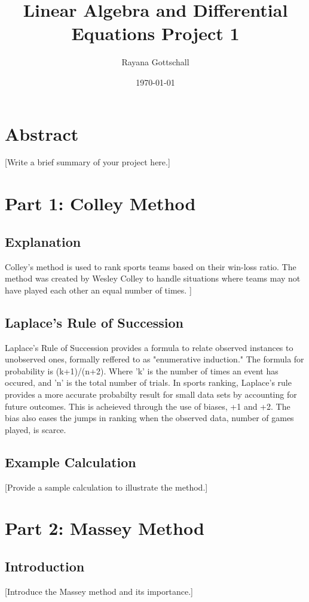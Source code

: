 \documentclass[12pt]{article}
\title{Linear Algebra and Differential Equations Project 1}
\author{Rayana Gottschall}
\date{\today}
\begin{document}
\maketitle
\newpage

\section*{Abstract}
[Write a brief summary of your project here.]

\section{Part 1: Colley Method}
\subsection{Explanation}
Colley's method is used to rank sports teams based on their win-loss ratio.
The method was created by Wesley Colley to handle situations where teams may 
not have played each other an equal number of times. ]

\subsection{Laplace's Rule of Succession}
Laplace's Rule of Succession provides a formula to relate observed 
instances to unobserved ones, formally reffered to as "enumerative induction." 
The formula for probability is (k+1)/(n+2). Where 'k' is the number of times an event has occured, and 'n' is the total number of trials. 
In sports ranking, Laplace's rule provides a more accurate probabilty result for small data sets by accounting for future outcomes. 
This is acheieved through the use of biases, +1 and +2. 
The bias also eases the jumps in ranking when the observed data, number of games played, is scarce.


\subsection{Example Calculation}
[Provide a sample calculation to illustrate the method.]

\section{Part 2: Massey Method}
\subsection{Introduction}
[Introduce the Massey method and its importance.]
\end{document}
